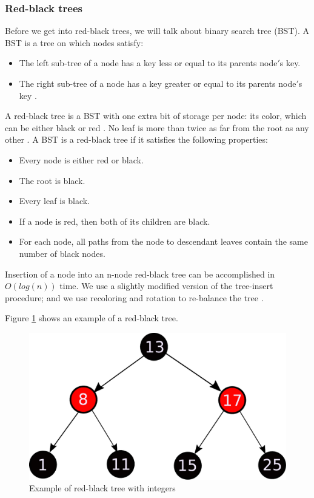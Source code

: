 \documentclass{sig-alternate-05-2015}
\begin{document}
    \subsubsection{Red-black trees}
      Before we get into red-black trees, we will talk about binary search tree (BST). A BST is a tree on which nodes satisfy:
      \begin{itemize}
        \item The left sub-tree of a node has a key less or equal to its parents node$'$s key.
        \item The right sub-tree of a node has a key greater or equal to its parents node$'$s key \cite{Tuto:Data}.
      \end{itemize}
      A red-black tree is a BST with one extra bit of storage per node: its color, which can be either black or red \cite{Cormen:Algorithms}.
      No leaf is more than twice as far from the root as any other \cite{Black:RBTree}.
      A BST is a red-black tree if it satisfies the following properties:
      \begin{itemize}
        \item Every node is either red or black.
        \item The root is black.
        \item Every leaf is black.
        \item If a node is red, then both of its children are black.
        \item For each node, all paths from the node to descendant leaves contain the same number of black nodes.
      \end{itemize}
      Insertion of a node into an n-node red-black tree can be accomplished in $O(log(n))$
      time. We use a slightly modified version of the tree-insert procedure; and we use recoloring and rotation to re-balance the tree \cite{Cormen:Algorithms}.

      Figure \ref{img:RBTree} shows an example of a red-black tree.

      \begin{figure}[b]
        \centering
        \includegraphics[scale=0.35]{RBTree.pdf}
        \caption{Example of red-black tree with integers}
        \label{img:RBTree}
      \end{figure}
\end{document}

